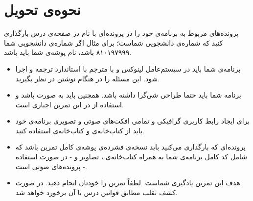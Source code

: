 \documentclass{utap}
\begin{document}
\section{نحوه‌ی تحویل}
    پرونده‌‌های مربوط به برنامه‌ی خود را در پرونده‌ای با نام  در صفحه‌ی  درس بارگذاری کنید که  شماره‌ی دانشجویی شماست؛ برای مثال اگر شماره‌ی دانشجویی شما ۸۱۰۱۹۷۹۹۹ باشد، نام پوشه‌ی شما باید  باشد.
    \begin{itemize}
        \item
برنامه‌ی شما باید در سیستم‌عامل لینوکس و با مترجم  با استاندارد  ترجمه و اجرا شود. این مسئله را در هنگام نوشتن  در نظر بگیرید.
	\item
برنامه شما باید حتما طراحی شی‌گرا داشته باشد. همچنین باید به صورت  باشد و استفاده از  در این تمرین اجباری است.
	\item
برای ایجاد رابط کاربری گرافیکی و تمامی افکت‌های صوتی و تصویری برنامه‌ی خود باید از کتاب‌خانه‌ی  و کتاب‌خانه‌ی  استفاده کنید.
        \item
پرونده‌ای که بارگذاری می‌کنید باید نسخه‌ی فشرده‌ی پوشه‌ی کامل تمرین باشد که شامل کد کامل برنامه‌ی شما به همراه کتاب‌خانه‌ی ، تصاویر و - در صورت استفاده - پرونده‌های صوتی است.
        \item
هدف این تمرین یادگیری شماست. لطفاً تمرین را خودتان انجام دهید. در صورت کشف تقلب مطابق قوانین درس با آن برخورد خواهد شد.
    \end{itemize}
\end{document}
